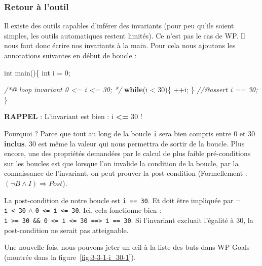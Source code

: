 \documentclass[12pt,francais,]{scrbook}
\newenvironment{Shaded}{}{}
\newcommand{\KeywordTok}[1]{\textcolor[rgb]{0.00,0.44,0.13}{\textbf{{#1}}}}
\newcommand{\DataTypeTok}[1]{\textcolor[rgb]{0.56,0.13,0.00}{{#1}}}
\newcommand{\DecValTok}[1]{\textcolor[rgb]{0.25,0.63,0.44}{{#1}}}
\newcommand{\CommentTok}[1]{\textcolor[rgb]{0.38,0.63,0.69}{\textit{{#1}}}}
\newcommand{\NormalTok}[1]{{#1}}
\newenvironment{zdsalertblock}[1]{%
  \tcolorbox[beamer,%
    noparskip,breakable,
    colback=LightCoral,colframe=DarkRed,%
    colbacklower=Tomato,%
    title=#1]
}{\endtcolorbox}
\begin{document}
\subsubsection{Retour à l'outil}\label{retour-uxe0-loutil}

Il existe des outils capables d'inférer des invariants (pour peu qu'ils
soient simples, les outils automatiques restent limités). Ce n'est pas
le cas de WP. Il nous faut donc écrire nos invariants à la main. Pour
cela nous ajoutons les annotations suivantes en début de boucle :

\begin{footnotesize}\begin{Shaded}
\begin{Highlighting}[]
\DataTypeTok{int} \NormalTok{main()\{}
  \DataTypeTok{int} \NormalTok{i = }\DecValTok{0}\NormalTok{;}
  
  \CommentTok{/*@}
\CommentTok{    loop invariant 0 <= i <= 30;}
\CommentTok{  */}
  \KeywordTok{while}\NormalTok{(i < }\DecValTok{30}\NormalTok{)\{}
    \NormalTok{++i;}
  \NormalTok{\}}
  \CommentTok{//@assert i == 30;}
\NormalTok{\}}
\end{Highlighting}
\end{Shaded}\end{footnotesize}

\begin{zdsalertblock}{Attention}
  \textbf{RAPPEL} : L'invariant est bien : i \textbf{\textless{}=} 30 !
\end{zdsalertblock}

Pourquoi ? Parce que tout au long de la boucle \texttt{i} sera bien
compris entre 0 et 30 \textbf{inclus}. 30 est même la valeur qui nous
permettra de sortir de la boucle. Plus encore, une des propriétés
demandées par le calcul de plus faible pré-conditions sur les boucles
est que lorsque l'on invalide la condition de la boucle, par la
connaissance de l'invariant, on peut prouver la post-condition
(Formellement : \((\neg B \wedge I) \Rightarrow Post\)).

La post-condition de notre boucle est \texttt{i\ ==\ 30}. Et doit être
impliquée par \(\neg\) \texttt{i\ \textless{}\ 30} \(\wedge\)
\texttt{0\ \textless{}=\ i\ \textless{}=\ 30}. Ici, cela fonctionne bien
:
\texttt{i\ \textgreater{}=\ 30\ \&\&\ 0\ \textless{}=\ i\ \textless{}=\ 30\ ==\textgreater{}\ i\ ==\ 30}.
Si l'invariant excluait l'égalité à 30, la post-condition ne serait pas
atteignable.

Une nouvelle fois, nous pouvons jeter un œil à la liste des buts dans WP
Goals (montrée dans la figure~\ref{fig:3-3-1-i_30-1}).
\end{document}

